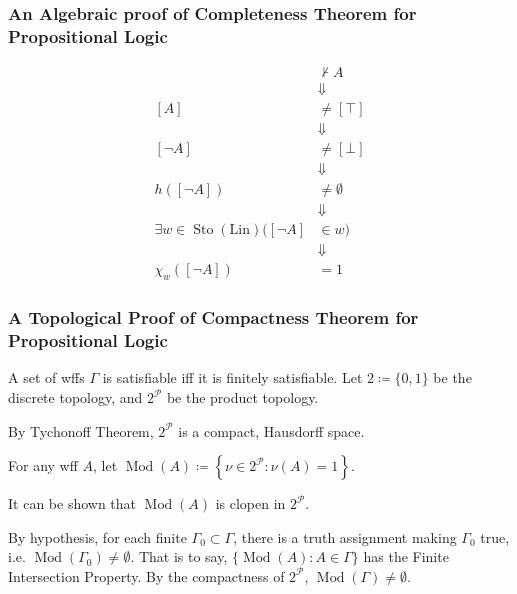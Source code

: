 \documentclass[UTF8,11pt,colorlinks,compress,openany]{beamer}%
\begin{document}
\begin{frame}\frametitle{\small An Algebraic proof of Completeness Theorem for Propositional Logic}
\setlength\abovedisplayskip{0pt}
\setlength\belowdisplayskip{0pt}
\begin{align*}
				&\nvdash A\\
				&\Downarrow\\
				[A]&\neq[\top]\\
				&\Downarrow\\
				[\neg A]&\neq[\bot]\\
				&\Downarrow\\
				h\left([\neg A]\right)&\neq\emptyset\\
				&\Downarrow\\
				\exists w\in\operatorname{Sto}(\mathrm{Lin})\big([\neg A]&\in w\big)\\
				&\Downarrow\\
				\chi_w\left([\neg A]\right)&=1
\end{align*}
\end{frame}

\begin{frame}\frametitle{\small A Topological Proof of Compactness Theorem for Propositional Logic}
\begin{block}{A set of wffs $\Gamma$ is satisfiable iff it is finitely satisfiable.}
Let $2\coloneqq \{0,1\}$ be the discrete topology, and $2^{\mathcal{P}}$ be the product topology.

By Tychonoff Theorem, $2^{\mathcal{P}}$ is a compact, Hausdorff space.

For any wff $A$, let $\operatorname{Mod}(A)\coloneqq \left\{\nu\in 2^{\mathcal{P}}: \nu(A)=1\right\}$.

It can be shown that $\operatorname{Mod}(A)$ is clopen in $2^{\mathcal{P}}$.

By hypothesis, for each finite $\Gamma_0\subset\Gamma$, there is a truth assignment making $\Gamma_0$ true, i.e. $\operatorname{Mod}(\Gamma_0)\neq\emptyset$. That is to say, $\{\operatorname{Mod}(A): A\in\Gamma\}$ has the Finite Intersection Property. By the compactness of $2^{\mathcal{P}}$, $\operatorname{Mod}(\Gamma)\neq\emptyset$.
\end{block}
\end{frame}
\end{document}
